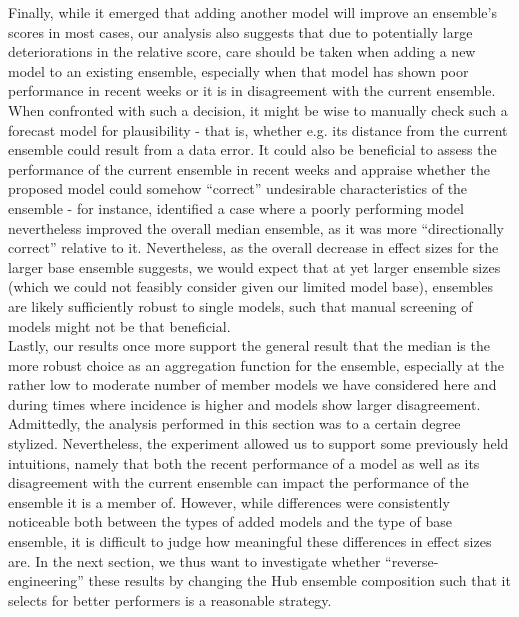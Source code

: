 Finally, while it emerged that adding another model will improve an ensemble's scores in most cases, our analysis also suggests that due to potentially large deteriorations in the relative score, care should be taken when adding a new model to an existing ensemble, especially when that model has shown poor performance in recent weeks or it is in disagreement with the current ensemble. When confronted with such a decision, it might be wise to manually check such a forecast model for plausibility - that is, whether e.g. its distance from the current ensemble could result from a data error. It could also be beneficial to assess the performance of the current ensemble in recent weeks and appraise whether the proposed model could somehow ``correct'' undesirable characteristics of the ensemble - for instance, \cite{bosse_comparing_2021} identified a case where a poorly performing model nevertheless improved the overall median ensemble, as it was more ``directionally correct'' relative to it. Nevertheless, as the overall decrease in effect sizes for the larger base ensemble suggests, we would expect that at yet larger ensemble sizes (which we could not feasibly consider given our limited model base), ensembles are likely sufficiently robust to single models, such that manual screening of models might not be that beneficial.\\
Lastly, our results once more support the general result that the median is the more robust choice as an aggregation function for the ensemble, especially at the rather low to moderate number of member models we have considered here and during times where incidence is higher and models show larger disagreement.\\
Admittedly, the analysis performed in this section was to a certain degree stylized. Nevertheless, the experiment allowed us to support some previously held intuitions, namely that both the recent performance of a model as well as its disagreement with the current ensemble can impact the performance of the ensemble it is a member of. However, while differences were consistently noticeable both between the types of added models and the type of base ensemble, it is difficult to judge how meaningful these differences in effect sizes are. In the next section, we thus want to investigate whether ``reverse-engineering'' these results by changing the Hub ensemble composition such that it selects for better performers is a reasonable strategy.\\
